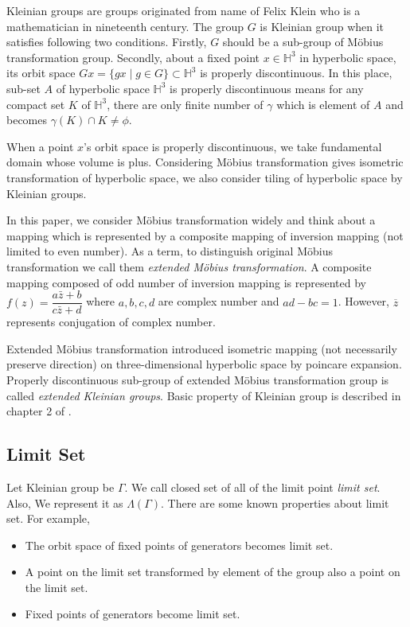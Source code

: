 Kleinian groups are groups originated from name of Felix Klein who is
a mathematician in nineteenth century.
The group $G$ is Kleinian group when it satisfies following two
conditions. 
Firstly, $G$ should be a sub-group of M\"obius transformation group.
Secondly, about a fixed point $x\in\mathbb{H}^3$ in hyperbolic space,
its orbit space $Gx = \{ gx \mid g\in G\}\subset \mathbb{H}^3$
is properly discontinuous.
In this place, sub-set $A$ of hyperbolic space $\mathbb{H}^3$
is properly discontinuous means
for any compact set $K$ of $\mathbb{H}^3$,
there are only finite number of $\gamma$ which is element of $A$
and becomes $\gamma (K) \cap K \neq \phi$.

When a point $x$'s orbit space is properly discontinuous, we take
fundamental domain whose volume is plus.
Considering M\"obius transformation gives isometric transformation of
hyperbolic space, we also consider tiling of hyperbolic space by
Kleinian groups. 

In this paper, we consider M\"obius transformation widely and
think about a mapping which is represented by a composite mapping of
inversion mapping (not limited to even number).
As a term, to distinguish original M\"obius transformation
we call them \textit{extended M\"obius transformation}.
A composite mapping composed of odd number of inversion mapping
is represented by $f(z)=\dfrac{a{\bar{z}}+b}{c{\bar{z}}+d}$ where
$a, b, c, d$ are complex number and $ad-bc = 1$.
However, $\overline{z}$ represents conjugation of complex number.

Extended M\"obius transformation introduced isometric mapping (not
necessarily preserve direction) on three-dimensional hyperbolic space by
poincare expansion.
Properly discontinuous sub-group of extended M\"obius transformation group
is called \textit{extended Kleinian groups}.
Basic property of Kleinian group is described in chapter 2 of \cite{marden_2016}.

\subsection{Limit Set}

Let Kleinian group be $\Gamma$.
We call closed set of all of the limit point \textit{limit set}.
Also, We represent it as $\Lambda(\Gamma)$.
There are some known properties about limit set.
For example,
\begin{itemize}
 \item The orbit space of fixed points of generators becomes limit set.
 \item A point on the limit set transformed by element of the group 
       also a point on the limit set.
 \item Fixed points of generators become limit set.
\end{itemize}

